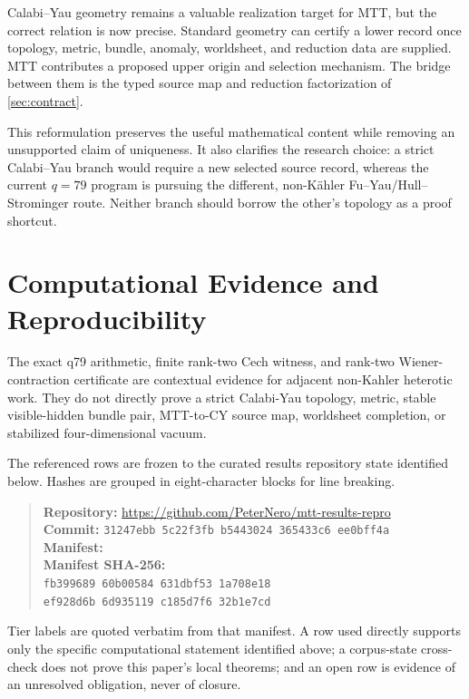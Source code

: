 \documentclass[11pt]{article}
\theoremstyle{definition}
\theoremstyle{remark}
\begin{document}
Calabi--Yau geometry remains a valuable realization target for MTT, but the
correct relation is now precise.  Standard geometry can certify a lower
record once topology, metric, bundle, anomaly, worldsheet, and reduction data
are supplied.  MTT contributes a proposed upper origin and selection
mechanism.  The bridge between them is the typed source map and reduction
factorization of \cref{sec:contract}.

This reformulation preserves the useful mathematical content while removing
an unsupported claim of uniqueness.  It also clarifies the research choice:
a strict Calabi--Yau branch would require a new selected source record,
whereas the current \(q=79\) program is pursuing the different, non-K\"ahler
Fu--Yau/Hull--Strominger route.  Neither branch should borrow the other's
topology as a proof shortcut.



\section*{Computational Evidence and Reproducibility}
The exact q79 arithmetic, finite rank-two Cech witness, and rank-two Wiener-contraction certificate are contextual evidence for adjacent non-Kahler heterotic work. They do not directly prove a strict Calabi-Yau topology, metric, stable visible-hidden bundle pair, MTT-to-CY source map, worldsheet completion, or stabilized four-dimensional vacuum.

The referenced rows are frozen to the curated results repository state identified below. Hashes are grouped in eight-character blocks for line breaking.
\begin{quote}\small
\textbf{Repository:} \url{https://github.com/PeterNero/mtt-results-repro}\\
\textbf{Commit:} \texttt{31247ebb 5c22f3fb b5443024 365433c6 ee0bff4a}\\
\textbf{Manifest:} \\
\textbf{Manifest SHA-256:}\\
\texttt{fb399689 60b00584 631dbf53 1a708e18}\\
\texttt{ef928d6b 6d935119 c185d7f6 32b1e7cd}
\end{quote}

Tier labels are quoted verbatim from that manifest. A row used directly supports only the specific computational statement identified above; a corpus-state cross-check does not prove this paper's local theorems; and an open row is evidence of an unresolved obligation, never of closure.
\end{document}

